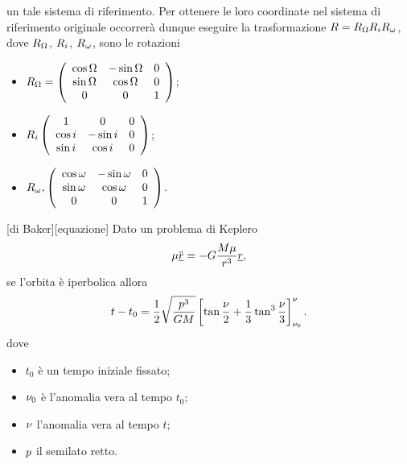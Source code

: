 un tale sistema di riferimento. Per ottenere le loro coordinate nel
sistema di riferimento originale occorrer\`a dunque eseguire la
trasformazione
$R
  = R_{\Omega}
    R_{i}
    R_{\omega}$,
dove $R_{\Omega}$, $R_{i}$,
$R_{\omega}$, sono le rotazioni
\begin{itemize}
  \item $R_{\Omega} =
        \left (
        \begin{array}{ccc}
          \cos{\Omega} &
          - \sin{\Omega} &
          0\\
          \sin{\Omega} &
          \cos{\Omega} &
          0\\
          0 &
          0 &
          1
        \end{array}
        \right )$;
  \item $R_{i}
        \left (
        \begin{array}{ccc}
          1 &
          0 &
          0\\
          \cos{i} &
          - \sin{i} &
          0\\
          \sin{i} &
          \cos{i} &
          0\\
        \end{array}
        \right )$;
  \item $R_{\omega},
        \left (
        \begin{array}{ccc}
          \cos{\omega} &
          - \sin{\omega} &
          0\\
          \sin{\omega} &
          \cos{\omega} &
          0\\
          0 &
          0 &
          1
        \end{array}
        \right )$. \EndProof
\end{itemize}
\begin{Theorem}
  [di Baker][equazione]
  Dato un problema di Keplero
	\[
		\mu \ddot{\underline{r}}
    = - G \frac{M\mu}{r^3}\underline{r},
	\]
  se l'orbita \`e iperbolica allora
  \[ 
    t - t_0
    = \frac{1}{2}
    \sqrt{\frac{p^3}{GM}}
    \left [
    \tan \frac{\nu}{2}
    + \frac{1}{3} \tan^3 \frac{\nu}{3}
    \right ]_{\nu_0}^{\nu}.
  \]
  dove
  \begin{itemize}
    \item $t_0$ \`e un tempo iniziale fissato;
    \item $\nu_0$ \`e l'anomalia vera al tempo $t_0$;
    \item $\nu$ l'anomalia vera al tempo $t$;
    \item $p$ il semilato retto.
  \end{itemize}
\end{Theorem}

